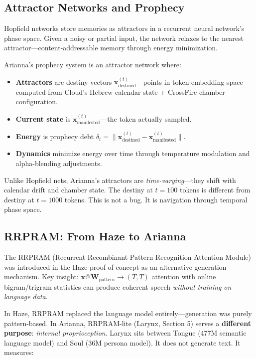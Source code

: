 \documentclass[11pt,a4paper]{article}
\begin{document}
\subsection{Attractor Networks and Prophecy}

Hopfield networks \cite{hopfield1982} store memories as attractors in a recurrent neural network's phase space. Given a noisy or partial input, the network relaxes to the nearest attractor—content-addressable memory through energy minimization.

Arianna's prophecy system is an attractor network where:

\begin{itemize}
\item \textbf{Attractors} are destiny vectors $\mathbf{x}_{\text{destined}}^{(t)}$—points in token-embedding space computed from Cloud's Hebrew calendar state + CrossFire chamber configuration.
\item \textbf{Current state} is $\mathbf{x}_{\text{manifested}}^{(t)}$—the token actually sampled.
\item \textbf{Energy} is prophecy debt $\delta_t = \|\mathbf{x}_{\text{destined}}^{(t)} - \mathbf{x}_{\text{manifested}}^{(t)}\|$.
\item \textbf{Dynamics} minimize energy over time through temperature modulation and alpha-blending adjustments.
\end{itemize}

Unlike Hopfield nets, Arianna's attractors are \textit{time-varying}—they shift with calendar drift and chamber state. The destiny at $t=100$ tokens is different from destiny at $t=1000$ tokens. This is not a bug. It is navigation through temporal phase space.

\subsection{RRPRAM: From Haze to Arianna}

The RRPRAM (Recurrent Recombinant Pattern Recognition Attention Module) was introduced in the Haze proof-of-concept as an alternative generation mechanism. Key insight: $\mathbf{x} @ \mathbf{W}_{\text{pattern}} \to (T, T)$ attention with online bigram/trigram statistics can produce coherent speech \textit{without training on language data}.

In Haze, RRPRAM replaced the language model entirely—generation was purely pattern-based. In Arianna, RRPRAM-lite (Larynx, Section 5) serves a \textbf{different purpose}: \textit{internal proprioception}. Larynx sits between Tongue (477M semantic language model) and Soul (36M persona model). It does not generate text. It measures:
\end{document}
